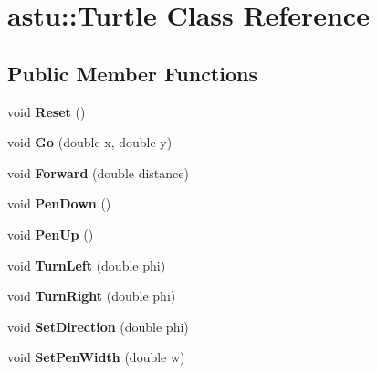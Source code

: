 \hypertarget{classastu_1_1Turtle}{}\section{astu\+:\+:Turtle Class Reference}
\label{classastu_1_1Turtle}
\subsection*{Public Member Functions}
\begin{DoxyCompactItemize}
\item 
\mbox{\label{classastu_1_1Turtle_a7c6f511e6502859aa5bddab295ef1474}} 
void {\bfseries Reset} ()
\item 
\mbox{\label{classastu_1_1Turtle_a2bdfb7aa71bab9e6c3029326b5b181bc}} 
void {\bfseries Go} (double x, double y)
\item 
\mbox{\label{classastu_1_1Turtle_a024a025b8633159d411f723cae818f4f}} 
void {\bfseries Forward} (double distance)
\item 
\mbox{\label{classastu_1_1Turtle_a81bba0ac526b01b14ca8c9ba5c854f61}} 
void {\bfseries Pen\+Down} ()
\item 
\mbox{\label{classastu_1_1Turtle_a58bdbb1226a612117c38678136f4a2ab}} 
void {\bfseries Pen\+Up} ()
\item 
\mbox{\label{classastu_1_1Turtle_ac2328d3c5bd8ee566978672c04de377b}} 
void {\bfseries Turn\+Left} (double phi)
\item 
\mbox{\label{classastu_1_1Turtle_a57c73429197cb442638a85f37535aaf5}} 
void {\bfseries Turn\+Right} (double phi)
\item 
\mbox{\label{classastu_1_1Turtle_aafdc27bab0450a0921408a6b77dfa76d}} 
void {\bfseries Set\+Direction} (double phi)
\item 
\mbox{\label{classastu_1_1Turtle_adb49ad6bd0b4d58e0a130f72d9dcb70a}} 
void {\bfseries Set\+Pen\+Width} (double w)
\item 

\end{DoxyCompactItemize}
